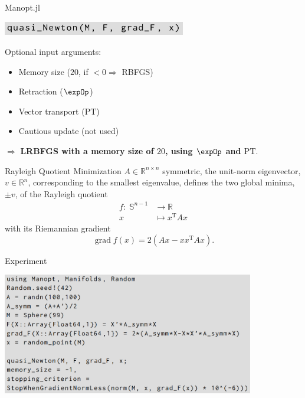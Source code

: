 \documentclass[9.4pt]{beamer}
\begin{document}
\begin{frame}{Manopt.jl}
    \begin{center}
        \includegraphics[width=8cm]{img/quasi_Newton_call.png} \\[.5\baselineskip]
    \end{center}
    Optional input arguments:
    \begin{itemize}
        \item Memory size ($20$, if $<0 \Rightarrow$ RBFGS)
        \item Retraction ($\expOp$)
        \item Vector transport ($\mathrm{PT}$)
        \item Cautious update (not used) \\[.5\baselineskip]
    \end{itemize}
    $\Rightarrow$ \textbf{LRBFGS with a memory size of $20$, using $\expOp$ and $\mathrm{PT}$}. 
\end{frame}

\begin{frame}{Rayleigh Quotient Minimization}
    $A \in \mathbb{R}^{n \times n}$ symmetric, the unit-norm eigenvector, $v \in \mathbb{R}^n$, corresponding to the smallest eigenvalue, defines the two global minima, $\pm v$, of the Rayleigh quotient  
    \begin{equation*}
        \begin{split}
            f \colon \; \mathbb{S}^{n-1} & \to \mathbb{R} \\
            x & \mapsto x^{\mathrm{T}} A x 
        \end{split}
    \end{equation*}   
    with its Riemannian gradient \\[.3\baselineskip]
    \begin{equation*}
        \operatorname{grad} f(x) = 2(Ax - x x^{\mathrm{T}} A x).
    \end{equation*}
\end{frame}

\begin{frame}{Experiment}
    \begin{center}
        \includegraphics[width=11cm]{img/Rayleigh.png}
    \end{center}
\end{frame}
\end{document}
